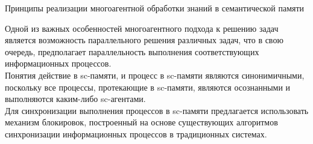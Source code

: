\begin{frame}{Принципы реализации многоагентной обработки знаний в семантической памяти}
		\topline
	\justifying
	
	Одной из важных особенностей многоагентного подхода к решению задач является возможность параллельного решения различных задач, что в свою очередь, предполагает параллельность выполнения соответствующих информационных процессов.\\
	Понятия действие в sc-памяти, и процесс в sc-памяти являются синонимичными, поскольку все процессы, протекающие в sc-памяти, являются осознанными и выполняются каким-либо sc-агентами.\\
	Для синхронизации выполнения процессов в sc-памяти предлагается использовать механизм блокировок, построенный на основе существующих алгоритмов синхронизации информационных процессов в традиционных системах.
\end{frame}

